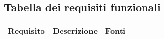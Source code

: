 \subsection{Tabella dei requisiti funzionali}

\begin{center}
	\begin{table}[h]
		\begin{tabular}{|l|p{}|c|}

		
		\textbf{Requisito} & \textbf{Descrizione} & \textbf{Fonti} \\ \midrule 	\midrule
		
		
		

\end{tabular}
\end{table}
\end{center}
